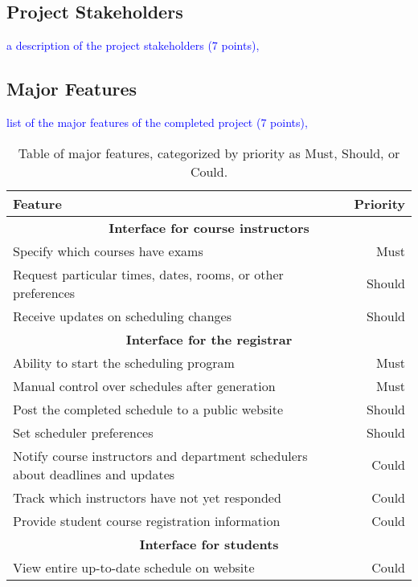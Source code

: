 \documentclass[11pt]{article}
\begin{document}
\subsection{Project Stakeholders} %
\textcolor{blue}{a description of the project stakeholders (7 points),}


\subsection{Major Features} %
\textcolor{blue}{ list of the major features of the completed project (7 points),}
\begin{table}[htbp]
  \centering
  \begin{tabular} {| l | r |}
    \hline
    \textbf{Feature} & \textbf{Priority} \\ \hline \hline
    \multicolumn{2}{|c|}{\textbf{Interface for course instructors}} \\ \hline
    Specify which courses have exams & Must \\ \hline
    Request particular times, dates, rooms, or other preferences & Should \\ \hline
    Receive updates on scheduling changes & Should \\ \hline
    \multicolumn{2}{|c|}{\textbf{Interface for the registrar}} \\ \hline
    Ability to start the scheduling program & Must \\ \hline
    Manual control over schedules after generation & Must \\ \hline
    Post the completed schedule to a public website & Should \\ \hline
    Set scheduler preferences & Should \\ \hline
    Notify course instructors and department schedulers about deadlines and updates & Could \\ \hline
    Track which instructors have not yet responded & Could \\ \hline
    Provide student course registration information & Could \\ \hline
    \multicolumn{2}{|c|}{\textbf{Interface for students}} \\ \hline
    View entire up-to-date schedule on website & Could \\ \hline
  \end{tabular}
  \caption{Table of major features, categorized by priority as Must, Should, or Could.}
\end{table}
\end{document}
